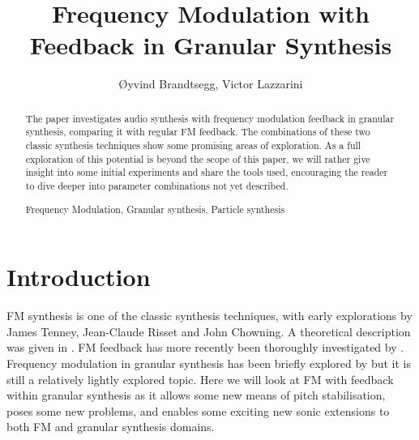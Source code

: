 \documentclass[runningheads,a4paper]{llncs}
\newcommand{\keywords}[1]{\par\addvspace\baselineskip
\noindent\keywordname\enspace\ignorespaces#1}
\begin{document}
\mainmatter  %

\title{Frequency Modulation with Feedback in Granular Synthesis}




\author{\O{}yvind Brandtsegg, Victor Lazzarini}
%




\maketitle

\begin{abstract}

The paper investigates audio synthesis with frequency modulation feedback in granular synthesis, comparing it with regular FM feedback. The combinations of these two classic synthesis techniques show some promising areas of exploration. As a full exploration of this potential is beyond the scope of this paper, we will rather give insight into some initial experiments and share the tools used, encouraging the reader to dive deeper into parameter combinations not yet described.

\keywords{Frequency Modulation, Granular synthesis, Particle synthesis}
\end{abstract}


\section{Introduction}
FM synthesis is one of the classic synthesis techniques, with early explorations by James Tenney, Jean-Claude Risset and John Chowning. A theoretical description was given in \cite{Chowning-73}. FM feedback has more recently been thoroughly investigated by \cite{Lazzarini-2024}. Frequency modulation in granular synthesis has been briefly explored by \cite{Ervik-Brandtsegg} but it is still a relatively lightly explored topic. Here we will look at FM with feedback within granular synthesis as it allows some new means of pitch stabilisation, poses some new problems, and enables some exciting new sonic extensions to both FM and granular synthesis domains.
\end{document}
